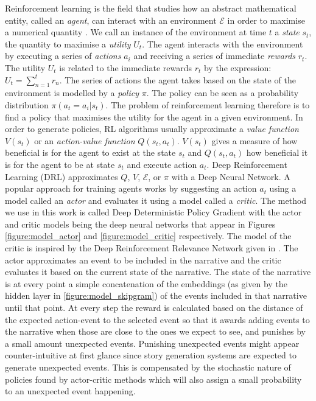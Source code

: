 \documentclass[11pt,letterpaper]{article}
\begin{document}
    
    Reinforcement learning is the field that studies how an abstract mathematical entity, called an \emph{agent}, can interact with an environment $\mathcal{E}$ in order to maximise a numerical quantity \cite{sutton1998reinforcement}. We call an instance of the environment at time $t$ a \emph{state} $s_t$, the quantity to maximise a \emph{utility} $U_t$. The agent interacts with the environment by executing a series of \emph{actions} $a_i$ and receiving a series of immediate \emph{rewards} $r_t$. The utility $U_t$ is related to the immediate rewards $r_t$ by the expression: $U_t = \sum_{n=1}^{t}r_n$. The series of actions the agent takes based on the state of the environment is modelled by a \emph{policy} $\pi$. The policy can be seen as a probability distribution $\pi(a_t = a_i | s_t)$. The problem of reinforcement learning therefore is to find a policy that maximises the utility for the agent in a given environment. In order to generate policies, RL algorithms usually approximate a \emph{value function} $V(s_t)$ or an \emph{action-value function} $Q(s_t, a_t)$. $V(s_t)$ gives a measure of how beneficial is for the agent to exist at the state $s_t$ and $Q(s_t, a_t)$ how beneficial it is for the agent to be at state $s_t$ and execute action $a_t$. Deep Reinforcement Learning (DRL) approximates $Q$, $V$,  $\mathcal{E}$, or $\pi$ with a Deep Neural Network. A popular approach for training agents works by suggesting an action $a_t$ using a model called an \emph{actor} and evaluates it using a model called a \emph{critic}.   The method we use in this work is called Deep Deterministic Policy Gradient \cite{lillicrap2015continuous} with the actor and critic models being the deep neural networks that appear in Figures \ref{figure:model_actor} and \ref{figure:model_critic} respectively. The model of the critic is inspired by the Deep Reinforcement Relevance Network given in \cite{he2015deep}. The actor approximates an event to be included in the narrative and the critic evaluates it based on the current state of the narrative. The state of the narrative is at every point a simple concatenation of the embeddings (as given by the hidden layer in \ref{figure:model_skipgram}) of the events included in that narrative until that point. At every step the reward is calculated based on the distance of the expected action-event  to the selected event so that it awards adding events to the narrative when those are close to the ones we expect to see, and punishes by a small amount unexpected events. Punishing unexpected events might appear counter-intuitive at first glance since story generation systems are expected to generate unexpected events. This is compensated by the stochastic nature of policies found by actor-critic methods which will also assign a small probability to an unexpected event happening.  
    
\end{document}
